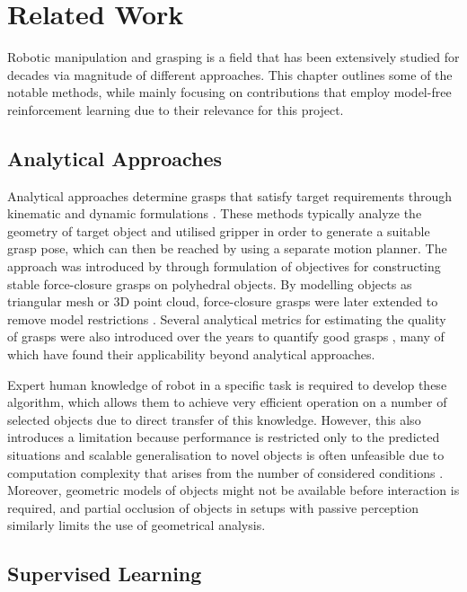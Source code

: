 \chapter{Related Work}

Robotic manipulation and grasping is a field that has been extensively studied for decades via magnitude of different approaches. This chapter outlines some of the notable methods, while mainly focusing on contributions that employ model-free reinforcement learning due to their relevance for this project.


\section{Analytical Approaches}

Analytical approaches determine grasps that satisfy target requirements through kinematic and dynamic formulations \cite{sahbani_overview_2012}. These methods typically analyze the geometry of target object and utilised gripper in order to generate a suitable grasp pose, which can then be reached by using a separate motion planner. The approach was introduced by \citet{nguyen_constructing_1987} through formulation of objectives for constructing stable force-closure grasps on polyhedral objects. By modelling objects as triangular mesh or 3D point cloud, force-closure grasps were later extended to remove model restrictions \cite{yun-hui_liu_complete_2004}. Several analytical metrics for estimating the quality of grasps were also introduced over the years to quantify good grasps \cite{roa_grasp_2015}, many of which have found their applicability beyond analytical approaches.

Expert human knowledge of robot in a specific task is required to develop these algorithm, which allows them to achieve very efficient operation on a number of selected objects due to direct transfer of this knowledge. However, this also introduces a limitation because performance is restricted only to the predicted situations and scalable generalisation to novel objects is often unfeasible due to computation complexity that arises from the number of considered conditions \cite{sahbani_overview_2012}. Moreover, geometric models of objects might not be available before interaction is required, and partial occlusion of objects in setups with passive perception similarly limits the use of geometrical analysis.


\section{Supervised Learning}

